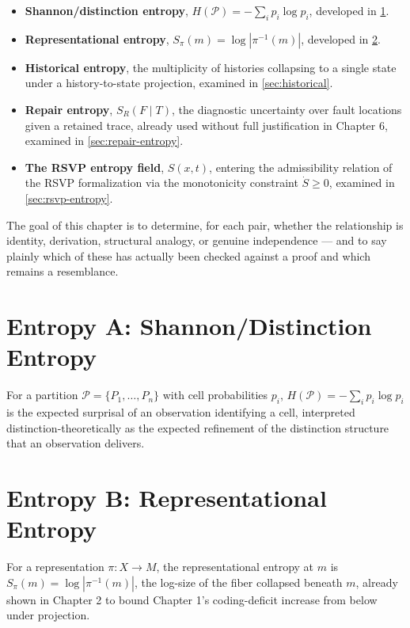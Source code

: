 \documentclass[12pt]{report}
\newcommand{\SR}{\ensuremath{S_R}}
\begin{document}
\begin{itemize}
\item[A.] \textbf{Shannon/distinction entropy}, $H(\mathcal{P}) =
      -\sum_i p_i \log p_i$, developed in \cref{sec:shannon-recall}.
\item[B.] \textbf{Representational entropy}, $S_\pi(m) =
      \log|\pi^{-1}(m)|$, developed in \cref{sec:rep-recall}.
\item[C.] \textbf{Historical entropy}, the multiplicity of histories
      collapsing to a single state under a history-to-state projection,
      examined in \cref{sec:historical}.
\item[D.] \textbf{Repair entropy}, $\SR(F \mid T)$, the diagnostic
      uncertainty over fault locations given a retained trace, already
      used without full justification in Chapter 6, examined in
      \cref{sec:repair-entropy}.
\item[E.] \textbf{The RSVP entropy field}, $S(x,t)$, entering the
      admissibility relation of the RSVP formalization via the
      monotonicity constraint $\dot{S} \geq 0$, examined in
      \cref{sec:rsvp-entropy}.
\end{itemize}

The goal of this chapter is to determine, for each pair, whether the
relationship is identity, derivation, structural analogy, or genuine
independence --- and to say plainly which of these has actually been
checked against a proof and which remains a resemblance.

\section{Entropy A: Shannon/Distinction Entropy}
\label{sec:shannon-recall}

For a partition $\mathcal{P} = \{P_1,\ldots,P_n\}$
with cell probabilities $p_i$, $H(\mathcal{P}) = -\sum_i p_i \log p_i$ is
the expected surprisal of an observation identifying a cell, interpreted
distinction-theoretically as the expected refinement of the distinction
structure that an observation delivers.

\section{Entropy B: Representational Entropy}
\label{sec:rep-recall}

For a representation $\pi : X \to M$, the
representational entropy at $m$ is $S_\pi(m) = \log|\pi^{-1}(m)|$, the
log-size of the fiber collapsed beneath $m$, already shown in Chapter 2
to bound Chapter 1's coding-deficit increase from below under projection.
\end{document}
